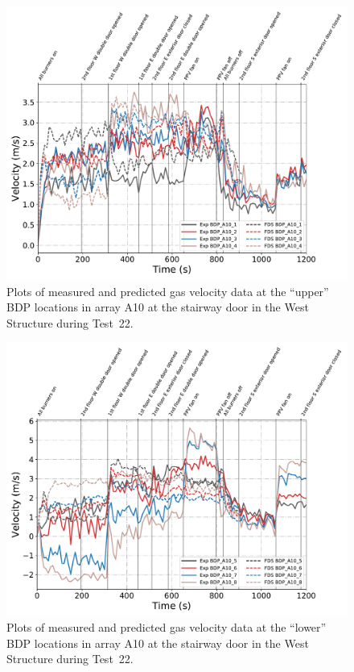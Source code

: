 \begin{figure}[!h]
	\centering
	\includegraphics[width=\columnwidth]{Figures/Plots/Validation/Velocity/Test_22_BDP_A10_upper}
	\caption[Plots of measured and predicted gas velocity data at ``upper'' BDP locations in A10 during Test~22.]{Plots of measured and predicted gas velocity data at the ``upper'' BDP locations in array A10 at the stairway door in the West Structure during Test~22.}
	\label{fig:Test22_upper_BDPs}
\end{figure}

\begin{figure}[!h]
	\centering
	\includegraphics[width=\columnwidth]{Figures/Plots/Validation/Velocity/Test_22_BDP_A10_lower}
	\caption[Plots of measured and predicted gas velocity data at ``lower'' BDP locations in A10 during Test~22.]{Plots of measured and predicted gas velocity data at the ``lower'' BDP locations in array A10 at the stairway door in the West Structure during Test~22.}
	\label{fig:Test22_lower_BDPs}
\end{figure}

